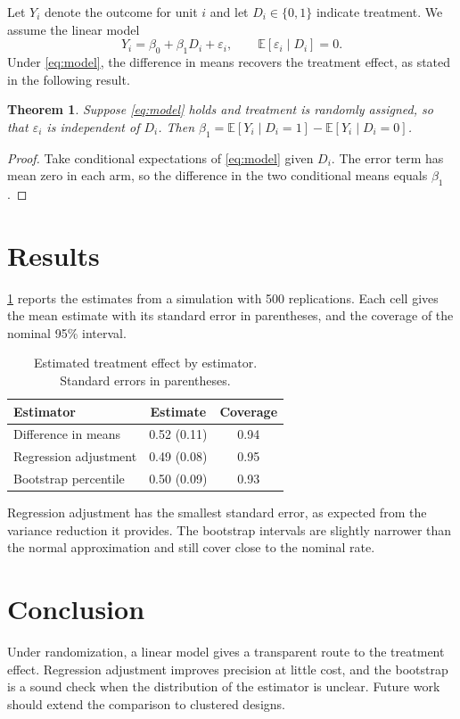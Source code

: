 \documentclass[11pt]{article}
\newtheorem{theorem}{Theorem}
\begin{document}
Let $Y_i$ denote the outcome for unit $i$ and let $D_i \in \{0,1\}$ indicate treatment. We assume the linear model
\begin{equation}\label{eq:model}
  Y_i = \beta_0 + \beta_1 D_i + \varepsilon_i,
  \qquad
  \mathbb{E}[\varepsilon_i \mid D_i] = 0.
\end{equation}
Under \cref{eq:model}, the difference in means recovers the treatment effect, as stated in the following result.

\begin{theorem}\label{thm:identification}
  Suppose \cref{eq:model} holds and treatment is randomly assigned, so that $\varepsilon_i$ is independent of $D_i$. Then $\beta_1 = \mathbb{E}[Y_i \mid D_i = 1] - \mathbb{E}[Y_i \mid D_i = 0]$.
\end{theorem}

\begin{proof}
  Take conditional expectations of \cref{eq:model} given $D_i$. The error term has mean zero in each arm, so the difference in the two conditional means equals $\beta_1$.
\end{proof}

\section{Results}\label{sec:results}

\cref{tab:results} reports the estimates from a simulation with 500 replications. Each cell gives the mean estimate with its standard error in parentheses, and the coverage of the nominal 95\% interval.

\begin{table}[ht]
  \centering
  \caption{Estimated treatment effect by estimator. Standard errors in parentheses.}\label{tab:results}
  \begin{tabular}{lcc}
    \toprule
    Estimator & Estimate & Coverage \\
    \midrule
    Difference in means & 0.52 (0.11) & 0.94 \\
    Regression adjustment & 0.49 (0.08) & 0.95 \\
    Bootstrap percentile & 0.50 (0.09) & 0.93 \\
    \bottomrule
  \end{tabular}
\end{table}

Regression adjustment has the smallest standard error, as expected from the variance reduction it provides. The bootstrap intervals are slightly narrower than the normal approximation and still cover close to the nominal rate.

\section{Conclusion}\label{sec:conclusion}

Under randomization, a linear model gives a transparent route to the treatment effect. Regression adjustment improves precision at little cost, and the bootstrap is a sound check when the distribution of the estimator is unclear. Future work should extend the comparison to clustered designs.



\end{document}
